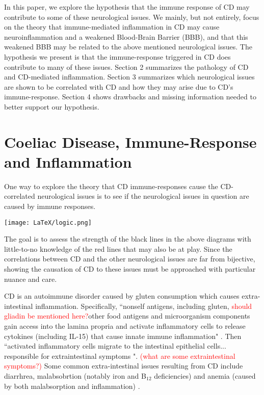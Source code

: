 \documentclass{article}
\begin{document}
  In this paper, we explore the hypothesis that the immune response of CD may contribute to some of these neurological issues. We mainly, but not entirely, focus on the theory that immune-mediated inflammation in CD may cause neuroinflammation and a weakened Blood-Brain Barrier (BBB), and that this weakened BBB may be related to the above mentioned neurological issues. The hypothesis we present is that the immune-response triggered in CD does contribute to many of these issues.
  Section 2 summarizes the pathology of CD and CD-mediated inflammation. Section 3 summarizes which neurological issues are shown to be correlated with CD and how they may arise due to CD's immune-response. Section 4 shows drawbacks and missing information needed to better support our hypothesis.

\section{Coeliac Disease, Immune-Response and Inflammation}
One way to explore the theory that CD immune-responses cause the CD-correlated neurological issues is to see if the neurological issues in question are caused by immune responses. 

\texttt{[image: LaTeX/logic.png]}

The goal is to assess the strength of the black lines in the above diagrams with little-to-no knowledge of the red lines that may also be at play. Since the correlations between CD and the other neurological issues are far from bijective, showing the causation of CD to these issues must be approached with particular nuance and care.

CD is an autoimmune disorder caused by gluten consumption which causes extra-intestinal inflammation. Specifically, ``nonself antigens, including gluten, \textcolor{red}{should gliadin be mentioned here?}other food antigens and microorganism components gain access into the lamina propria and activate inflammatory cells to release cytokines (including IL-15) that cause innate immune inflammation" \cite{Leffler DA}. Then ``activated inflammatory cells migrate to the intestinal epithelial cells... responsible for extraintestinal  symptoms \cite{Reilly}"\cite{Leffler DA}. \textcolor{red}{(what are some extraintestinal symptoms?)} Some common extra-intestinal issues resulting from CD include diarrhrea, malabsobrtion (notably iron and B$_{12}$ deficiencies) and anemia (caused by both malabsorption and inflammation) \cite{Leffler DA}. 
\end{document}
